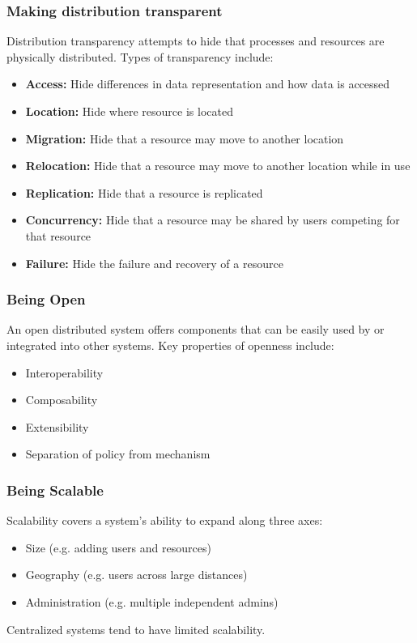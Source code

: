 \documentclass[12pt,titlepage]{article}
\begin{document}
      \subsubsection{Making distribution transparent}
        Distribution transparency attempts to hide that processes and resources are physically distributed. Types of transparency include:
        \begin{itemize}
          \item \textbf{Access:} Hide differences in data representation and how data is accessed
          \item \textbf{Location:} Hide where resource is located
          \item \textbf{Migration:} Hide that a resource may move to another location
          \item \textbf{Relocation:} Hide that a resource may move to another location while in use
          \item \textbf{Replication:} Hide that a resource is replicated
          \item \textbf{Concurrency:} Hide that a resource may be shared by users competing for that resource
          \item \textbf{Failure:} Hide the failure and recovery of a resource
        \end{itemize}

      \subsubsection{Being Open}
        An open distributed system offers components that can be easily used by or integrated into other systems. Key properties of openness
        include:
        \begin{itemize}
          \item Interoperability
          \item Composability
          \item Extensibility
          \item Separation of policy from mechanism
        \end{itemize}

      \subsubsection{Being Scalable}
        Scalability covers a system's ability to expand along three axes:
        \begin{itemize}
          \item Size (e.g. adding users and resources)
          \item Geography (e.g. users across large distances)
          \item Administration (e.g. multiple independent admins)
        \end{itemize}
        Centralized systems tend to have limited scalability.
\end{document}
